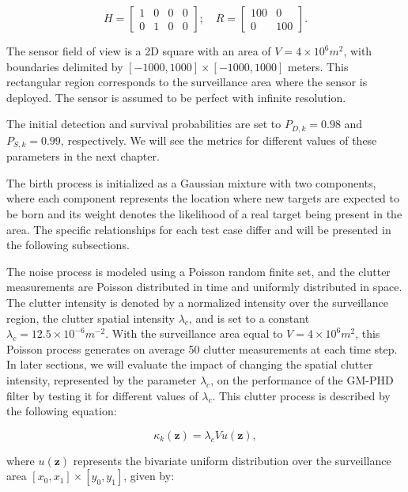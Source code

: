 \begin{equation}
    H =
    \begin{bmatrix}
        1 & 0 &0 & 0 \\
        0 & 1 &0 & 0
    \end{bmatrix};
    \quad
    R = \begin{bmatrix}
        100 & 0   \\
        0   & 100
    \end{bmatrix}.
\end{equation}

The sensor field of view is a 2D square with an area of $V = 4 \times 10^6 m^2$, with boundaries delimited by $[-1000, 1000] \times [-1000, 1000]$ meters. This rectangular region corresponds to the surveillance area where the sensor is deployed. The sensor is assumed to be perfect with infinite resolution.

The initial detection and survival probabilities are set to $P_{D,k} = 0.98$ and $P_{S,k} = 0.99$, respectively. We will see the metrics for different values of these parameters in the next chapter.

The birth process is initialized as a Gaussian mixture with two components, where each component represents the location where new targets are expected to be born and its weight denotes the likelihood of a real target being present in the area. The specific relationships for each test case differ and will be presented in the following subsections.

The noise process is modeled using a Poisson random finite set, and the clutter measurements are Poisson distributed in time and uniformly distributed in space. The clutter intensity is denoted by a normalized intensity over the surveillance region, the clutter spatial intensity $\lambda_c$, and is set to a constant $\lambda_c = 12.5 \times 10^{-6} m^{-2}$. With the surveillance area equal to $V = 4 \times 10^6 m^2$, this Poisson process generates on average 50 clutter measurements at each time step. In later sections, we will evaluate the impact of changing the spatial clutter intensity, represented by the parameter $\lambda_c$, on the performance of the GM-PHD filter by testing it for different values of $\lambda_c$. This clutter process is described by the following equation:

\begin{equation}
\kappa_k(\mathbf{z}) = \lambda_c V u(\mathbf{z}),
\end{equation}

\noindent where $u(\mathbf{z})$ represents the bivariate uniform distribution over the surveillance area $[x_0, x_1] \times [y_0, y_1]$, given by:

